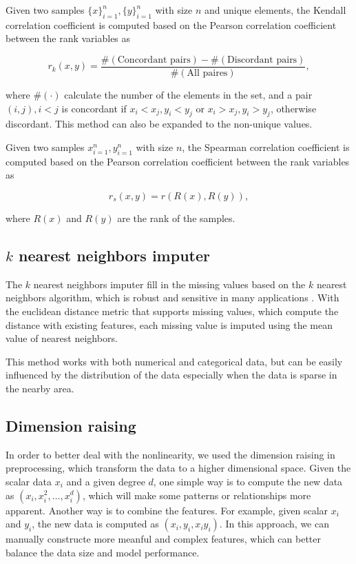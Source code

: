 \documentclass[11pt]{article}
\begin{document}
Given two samples $\{x\}_{i=1}^n, \{y\}_{i=1}^n$ with size $n$ and unique elements, the Kendall correlation coefficient is computed based on the Pearson correlation coefficient between the rank variables as

$$
  r_k (x, y) = \frac{\#(\text{Concordant pairs}) - \#(\text{Discordant pairs})}{\#(\text{All paires})},
$$

\noindent where $\#(\cdot)$ calculate the number of the elements in the set, and a pair $(i, j), i < j$ is concordant if $x_i < x_j, y_i < y_j$ or $x_i > x_j, y_i > y_j$, otherwise discordant. This method can also be expanded to the non-unique values.

Given two samples ${x}_{i=1}^n, {y}_{i=1}^n$ with size $n$, the Spearman correlation coefficient is computed based on the Pearson correlation coefficient between the rank variables as

$$
  r_s (x, y) = r(R(x), R(y)),
$$

\noindent where $R(x)$ and $R(y)$ are the rank of the samples.

\subsection{$k$ nearest neighbors imputer}

The $k$ nearest neighbors imputer fill in the missing values based on the $k$ nearest neighbors algorithm, which is  robust and sensitive in many applications \cite{troyanskaya2001missing} \cite{juna2022water}. With the euclidean distance metric that supports missing values, which compute the distance with existing features, each missing value is imputed using the mean value of nearest neighbors.

This method works with both numerical and categorical data, but can be easily influenced by the distribution of the data especially when the data is sparse in the nearby area.

\subsection{Dimension raising}

In order to better deal with the nonlinearity, we used the dimension raising in preprocessing, which transform the data to a higher dimensional space. Given the scalar data $x_i$ and a given degree $d$, one simple way is to compute the new data as $(x_i, x_i^2, \dots, x_i^d)$, which will make some patterns or relationships more apparent. Another way is to combine the features. For example, given scalar $x_i$ and $y_i$, the new data is computed as $(x_i, y_i, x_i y_i)$. In this approach, we can manually constructe more meanful and complex features, which can better balance the data size and model performance.
\end{document}
